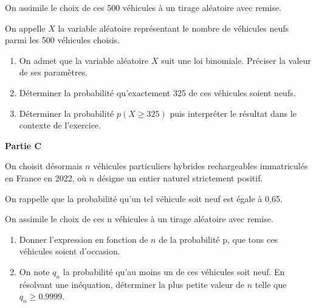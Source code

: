 On assimile le choix de ces 500 véhicules à un tirage aléatoire avec remise.

\smallskip

On appelle $X$ la variable aléatoire représentant le nombre de véhicules neufs parmi les 500 véhicules choisis.

\begin{enumerate}
	\item On admet que la variable aléatoire $X$ suit une loi binomiale. Préciser la valeur de ses paramètres.
	\item Déterminer la probabilité qu'exactement 325 de ces véhicules soient neufs.
	\item Déterminer la probabilité $p(X \geqslant 325)$ puis interpréter le résultat dans le contexte de l'exercice.
\end{enumerate}

\smallskip

\textbf{\large Partie C}

\medskip

On choisit désormais $n$ véhicules particuliers hybrides rechargeables immatriculés en France en 2022, où $n$ désigne un entier naturel strictement positif.

\smallskip

On rappelle que la probabilité qu'un tel véhicule soit neuf est égale à 0,65.

\smallskip

On assimile le choix de ces n véhicules à un tirage aléatoire avec remise.

\begin{enumerate}
	\item Donner l'expression en fonction de $n$ de la probabilité p, que tous ces véhicules soient d'occasion.
	\item On note $q_n$ la probabilité qu'au moins un de ces véhicules soit neuf. En résolvant une inéquation, déterminer la plus petite valeur de $n$ telle que $q_n \geqslant \num{0,9999}$.
\end{enumerate}